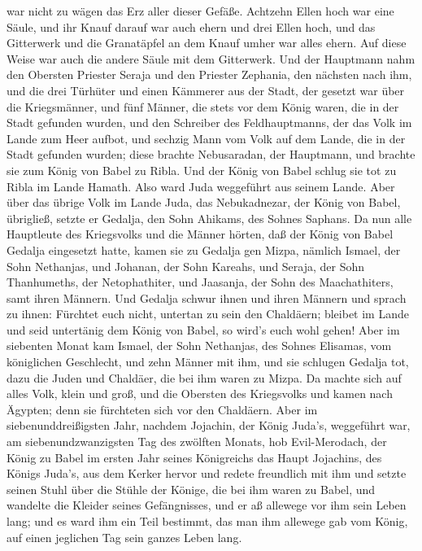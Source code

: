 war nicht zu wägen das Erz aller dieser Gefäße.  Achtzehn
Ellen hoch war eine Säule, und ihr Knauf darauf war auch ehern und drei
Ellen hoch, und das Gitterwerk und die Granatäpfel an dem Knauf umher
war alles ehern. Auf diese Weise war auch die andere Säule mit dem
Gitterwerk.  Und der Hauptmann nahm den Obersten Priester
Seraja und den Priester Zephania, den nächsten nach ihm, und die drei
Türhüter  und einen Kämmerer aus der Stadt, der gesetzt war
über die Kriegsmänner, und fünf Männer, die stets vor dem König waren,
die in der Stadt gefunden wurden, und den Schreiber des Feldhauptmanns,
der das Volk im Lande zum Heer aufbot, und sechzig Mann vom Volk auf dem
Lande, die in der Stadt gefunden wurden;  diese brachte
Nebusaradan, der Hauptmann, und brachte sie zum König von Babel zu
Ribla.  Und der König von Babel schlug sie tot zu Ribla im
Lande Hamath. Also ward Juda weggeführt aus seinem Lande. 
Aber über das übrige Volk im Lande Juda, das Nebukadnezar, der König von
Babel, übrigließ, setzte er Gedalja, den Sohn Ahikams, des Sohnes
Saphans.  Da nun alle Hauptleute des Kriegsvolks und die
Männer hörten, daß der König von Babel Gedalja eingesetzt hatte, kamen
sie zu Gedalja gen Mizpa, nämlich Ismael, der Sohn Nethanjas, und
Johanan, der Sohn Kareahs, und Seraja, der Sohn Thanhumeths, der
Netophathiter, und Jaasanja, der Sohn des Maachathiters, samt ihren
Männern.  Und Gedalja schwur ihnen und ihren Männern und
sprach zu ihnen: Fürchtet euch nicht, untertan zu sein den Chaldäern;
bleibet im Lande und seid untertänig dem König von Babel, so wird's euch
wohl gehen!  Aber im siebenten Monat kam Ismael, der Sohn
Nethanjas, des Sohnes Elisamas, vom königlichen Geschlecht, und zehn
Männer mit ihm, und sie schlugen Gedalja tot, dazu die Juden und
Chaldäer, die bei ihm waren zu Mizpa.  Da machte sich auf
alles Volk, klein und groß, und die Obersten des Kriegsvolks und kamen
nach Ägypten; denn sie fürchteten sich vor den Chaldäern. 
Aber im siebenunddreißigsten Jahr, nachdem Jojachin, der König Juda's,
weggeführt war, am siebenundzwanzigsten Tag des zwölften Monats, hob
Evil-Merodach, der König zu Babel im ersten Jahr seines Königreichs das
Haupt Jojachins, des Königs Juda's, aus dem Kerker hervor 
und redete freundlich mit ihm und setzte seinen Stuhl über die Stühle
der Könige, die bei ihm waren zu Babel,  und wandelte die
Kleider seines Gefängnisses, und er aß allewege vor ihm sein Leben lang;
 und es ward ihm ein Teil bestimmt, das man ihm allewege
gab vom König, auf einen jeglichen Tag sein ganzes Leben lang.
